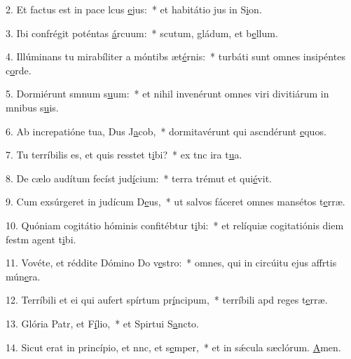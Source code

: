2. Et factus est in pace lcus \uline{e}jus:~* et habitátio jus in S\uline{i}on.\par 
3. Ibi confrégit poténtas \uline{á}rcuum:~* scutum, gládum, et b\uline{e}llum.\par 
4. Illúminans tu mirabíliter a móntibs æt\uline{é}rnis:~* turbáti sunt omnes insipéntes c\uline{o}rde.\par 
5. Dormiérunt smnum s\uline{u}um:~* et nihil invenérunt omnes viri divitiárum in mnibus s\uline{u}is.\par 
6. Ab increpatióne tua, Dus J\uline{a}cob,~* dormitavérunt qui ascndérunt \uline{e}quos.\par 
7. Tu terríbilis es, et quis resstet t\uline{i}bi?~* ex tnc ira t\uline{u}a.\par 
8. De cælo audítum fecíst jud\uline{í}cium:~* terra trémut et qui\uline{é}vit.\par 
9. Cum exsúrgeret in judícum D\uline{e}us,~* ut salvos fáceret omnes mansétos t\uline{e}rræ.\par 
10. Quóniam cogitátio hóminis confitébtur t\uline{i}bi:~* et relíquiæ cogitatiónis diem festm agent t\uline{i}bi.\par 
11. Vovéte, et réddite Dómino Do v\uline{e}stro:~* omnes, qui in circúitu ejus affrtis mún\uline{e}ra.\par 
12. Terríbili et ei qui aufert spírtum pr\uline{í}ncipum,~* terríbili apd reges t\uline{e}rræ.\par 
13. Glória Patr, et F\uline{í}lio,~* et Spirtui S\uline{a}ncto.\par 
14. Sicut erat in princípio, et nnc, et s\uline{e}mper,~* et in sǽcula sæclórum. \uline{A}men.\par 

